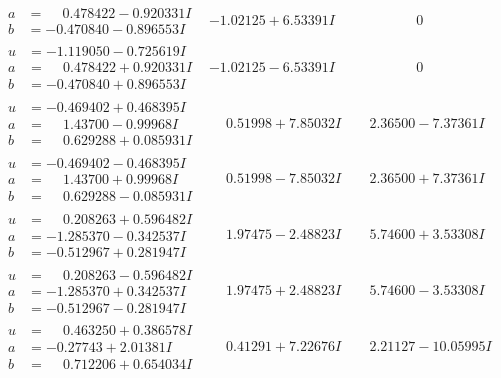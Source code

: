 \documentclass[1p]{elsarticle_modified}
\theoremstyle{definition}
\begin{document}
$$\begin{array}{c|c|c}
\begin{aligned}
a &= \phantom{-}0.478422 - 0.920331 I \\
b &= -0.470840 - 0.896553 I\end{aligned}
 & -1.02125 + 6.53391 I & \phantom{-0.000000 } 0 \\ \hline\begin{aligned}
u &= -1.119050 - 0.725619 I \\
a &= \phantom{-}0.478422 + 0.920331 I \\
b &= -0.470840 + 0.896553 I\end{aligned}
 & -1.02125 - 6.53391 I & \phantom{-0.000000 } 0 \\ \hline\begin{aligned}
u &= -0.469402 + 0.468395 I \\
a &= \phantom{-}1.43700 - 0.99968 I \\
b &= \phantom{-}0.629288 + 0.085931 I\end{aligned}
 & \phantom{-}0.51998 + 7.85032 I & \phantom{-}2.36500 - 7.37361 I \\ \hline\begin{aligned}
u &= -0.469402 - 0.468395 I \\
a &= \phantom{-}1.43700 + 0.99968 I \\
b &= \phantom{-}0.629288 - 0.085931 I\end{aligned}
 & \phantom{-}0.51998 - 7.85032 I & \phantom{-}2.36500 + 7.37361 I \\ \hline\begin{aligned}
u &= \phantom{-}0.208263 + 0.596482 I \\
a &= -1.285370 - 0.342537 I \\
b &= -0.512967 + 0.281947 I\end{aligned}
 & \phantom{-}1.97475 - 2.48823 I & \phantom{-}5.74600 + 3.53308 I \\ \hline\begin{aligned}
u &= \phantom{-}0.208263 - 0.596482 I \\
a &= -1.285370 + 0.342537 I \\
b &= -0.512967 - 0.281947 I\end{aligned}
 & \phantom{-}1.97475 + 2.48823 I & \phantom{-}5.74600 - 3.53308 I \\ \hline\begin{aligned}
u &= \phantom{-}0.463250 + 0.386578 I \\
a &= -0.27743 + 2.01381 I \\
b &= \phantom{-}0.712206 + 0.654034 I\end{aligned}
 & \phantom{-}0.41291 + 7.22676 I & \phantom{-}2.21127 - 10.05995 I \\ \hline\begin{aligned}

\end{aligned}
\end{array}$$
\end{document}
